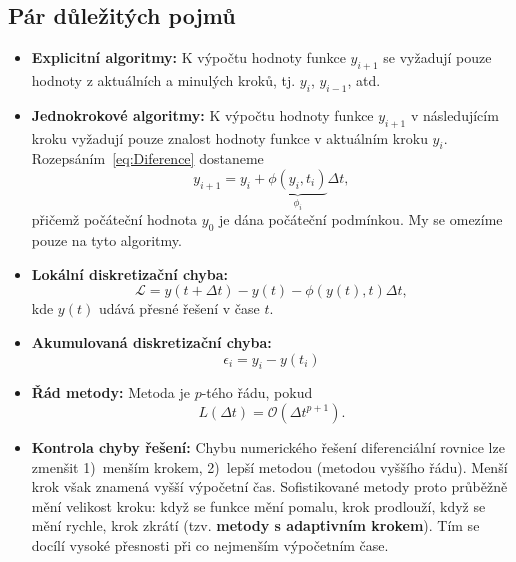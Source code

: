 \documentclass[a4paper,11pt,twoside]{article}
\theoremstyle{red}
\theoremstyle{green}
\begin{document}
\subsection{Pár důležitých pojmů}
    \begin{itemize}
        \item{\bf Explicitní algoritmy:}
        K výpočtu hodnoty funkce $y_{i+1}$ se vyžadují pouze hodnoty z aktuálních a minulých kroků, tj. $y_{i}$, $y_{i-1}$, atd.

        \item {\bf Jednokrokové algoritmy:}
        K výpočtu hodnoty funkce $y_{i+1}$ v následujícím kroku vyžadují pouze znalost hodnoty funkce v aktuálním kroku $y_{i}$.
        Rozepsáním~\eqref{eq:Diference} dostaneme
        \begin{equation}
            \label{eq:phi}
            \boxed{
                y_{i+1}=y_{i}+\underbrace{\phi(y_{i},t_{i})}_{\phi_{i}}\Delta t
            },
        \end{equation}
        přičemž počáteční hodnota $y_{0}$ je dána počáteční podmínkou.
        My se omezíme pouze na tyto algoritmy.

        \item {\bf Lokální diskretizační chyba:}
        \begin{equation}
            \mathcal{L}=y(t+\Delta t)-y(t)-\phi(y(t),t)\Delta t,
        \end{equation}        
        kde $y(t)$ udává přesné řešení v čase $t$.

        \item {\bf Akumulovaná diskretizační chyba:}
        \begin{equation}
            \label{eq:AkumulovanaChyba}
            \epsilon_{i}=y_{i}-y(t_{i})
        \end{equation}

        \item {\bf Řád metody:} 
        Metoda je $p$-tého řádu, pokud
        \begin{equation}\label{eq:RadMetodyODR}
            L(\Delta t)=\mathcal{O}(\Delta t^{p+1}).
        \end{equation}

        \item {\bf Kontrola chyby řešení:}
        Chybu numerického řešení diferenciální rovnice lze zmenšit 1)~menším krokem, 2)~lepší metodou (metodou vyššího řádu). 
        Menší krok však znamená vyšší výpočetní čas.
        Sofistikované metody proto průběžně mění velikost kroku: když se funkce mění pomalu, krok prodlouží, když se mění rychle, krok zkrátí (tzv. {\bf metody s adaptivním krokem}).
        Tím se docílí vysoké přesnosti při co nejmenším výpočetním čase.
    \end{itemize}
\end{document}
